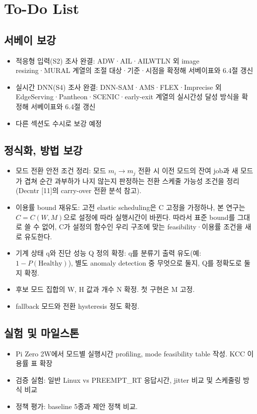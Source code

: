 \documentclass[10pt]{article}
\begin{document}
\section{To-Do List}
\subsection{서베이 보강}
\begin{itemize}
\item[$\square$] 적응형 입력(S2) 조사 완결: ADW·AIL·AILWTLN 외 image resizing·MURAL 계열의 조절 대상·기준·시점을 확정해 서베이표와 6.4절 갱신
\item[$\square$] 실시간 DNN(S4) 조사 완결: DNN-SAM·AMS·FLEX·Imprecise 외 EdgeServing·Pantheon·SCENIC·early-exit 계열의 실시간성 달성 방식을 확정해 서베이표와 6.4절 갱신
\item[$\square$] 다른 섹션도 수시로 보강 예정
\end{itemize}
\subsection{정식화, 방법 보강}
\begin{itemize}
\item[$\square$] 모드 전환 안전 조건 정리: 모드 $m_i \rightarrow m_j$ 전환 시 이전 모드의 잔여 job과 새 모드가 겹쳐 순간 과부하가 나지 않는지 판정하는 전환 스케줄 가능성 조건을 정리 (Decntr [11]의 carry-over 전환 분석 참고).
\item[$\square$] 이용률 bound 재유도: 고전 elastic scheduling은 C 고정을 가정하나, 본 연구는 $C = C(W, M)$으로 설정에 따라 실행시간이 바뀐다. 따라서 표준 bound를 그대로 쓸 수 없어, C가 설정의 함수인 우리 구조에 맞는 feasibility·이용률 조건을 새로 유도한다.
\item[$\square$] 기계 상태 q와 진단 성능 Q 정의 확정: q를 분류기 출력 유도(예: $1-P(\text{Healthy})$), 별도 anomaly detection 중 무엇으로 둘지, Q를 정확도로 둘지 확정.
\item[$\square$] 후보 모드 집합의 W, H 값과 개수 N 확정. 첫 구현은 M 고정.
\item[$\square$] fallback 모드와 전환 hysteresis 정도 확정.
\end{itemize}
\subsection{실험 및 마일스톤}
\begin{itemize}
\item[$\square$] Pi Zero 2W에서 모드별 실행시간 profiling, mode feasibility table 작성. KCC 이용률 표 확장
\item[$\square$] 검증 실험: 일반 Linux vs PREEMPT\_RT 응답시간, jitter 비교 및 스케줄링 방식 비교
\item[$\square$] 정책 평가: baseline 5종과 제안 정책 비교.
\end{itemize}
\end{document}

